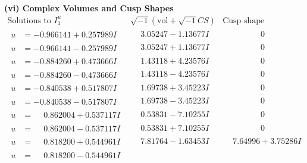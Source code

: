 \documentclass[1p]{elsarticle_modified}
\theoremstyle{definition}
\newcommand{\I}{\sqrt{-1}}
\begin{document}
\newpage\flushleft \textbf{(vi) Complex Volumes and Cusp Shapes}
$$\begin{array}{c|c|c}  
\text{Solutions to }I^u_{1}& \I (\text{vol} + \sqrt{-1}CS) & \text{Cusp shape}\\
 \hline 
\begin{aligned}
u &= -0.966141 + 0.257989 I\end{aligned}
 & \phantom{-}3.05247 - 1.13677 I & \phantom{-0.000000 } 0 \\ \hline\begin{aligned}
u &= -0.966141 - 0.257989 I\end{aligned}
 & \phantom{-}3.05247 + 1.13677 I & \phantom{-0.000000 } 0 \\ \hline\begin{aligned}
u &= -0.884260 + 0.473666 I\end{aligned}
 & \phantom{-}1.43118 + 4.23576 I & \phantom{-0.000000 } 0 \\ \hline\begin{aligned}
u &= -0.884260 - 0.473666 I\end{aligned}
 & \phantom{-}1.43118 - 4.23576 I & \phantom{-0.000000 } 0 \\ \hline\begin{aligned}
u &= -0.840538 + 0.517807 I\end{aligned}
 & \phantom{-}1.69738 + 3.45223 I & \phantom{-0.000000 } 0 \\ \hline\begin{aligned}
u &= -0.840538 - 0.517807 I\end{aligned}
 & \phantom{-}1.69738 - 3.45223 I & \phantom{-0.000000 } 0 \\ \hline\begin{aligned}
u &= \phantom{-}0.862004 + 0.537117 I\end{aligned}
 & \phantom{-}0.53831 - 7.10255 I & \phantom{-0.000000 } 0 \\ \hline\begin{aligned}
u &= \phantom{-}0.862004 - 0.537117 I\end{aligned}
 & \phantom{-}0.53831 + 7.10255 I & \phantom{-0.000000 } 0 \\ \hline\begin{aligned}
u &= \phantom{-}0.818200 + 0.544961 I\end{aligned}
 & \phantom{-}7.81764 - 1.63453 I & \phantom{-}7.64996 + 3.75286 I \\ \hline\begin{aligned}
u &= \phantom{-}0.818200 - 0.544961 I\end{aligned}

\end{array}$$
\end{document}
